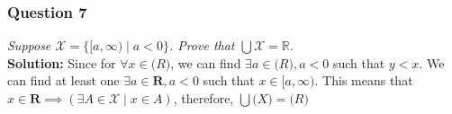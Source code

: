 \documentclass[
	letterpaper, %
	11pt, %
]{CSUniSchoolLabReport}
\begin{document}
\subsubsection*{Question 7}

\textit{Suppose $\mathcal{X} = \{[a, \infty) \mid a < 0\}$. Prove that $\bigcup \mathcal{X} = \mathbb{R}$.} \\

\textbf{Solution: } Since for $\forall x \in \mathbf(R)$, we can find $\exists a \in \mathbf(R), a < 0$ such that $y < x$. We can find at least one $\exists a \in \mathbf{R}, a < 0$ such that $x \in [a, \infty)$. 
This means that $x \in \mathbf{R} \implies (\exists A \in \mathcal{X} \mid x \in A)$, therefore, $\bigcup \mathcal(X) = \mathbf(R)$
\end{document}
